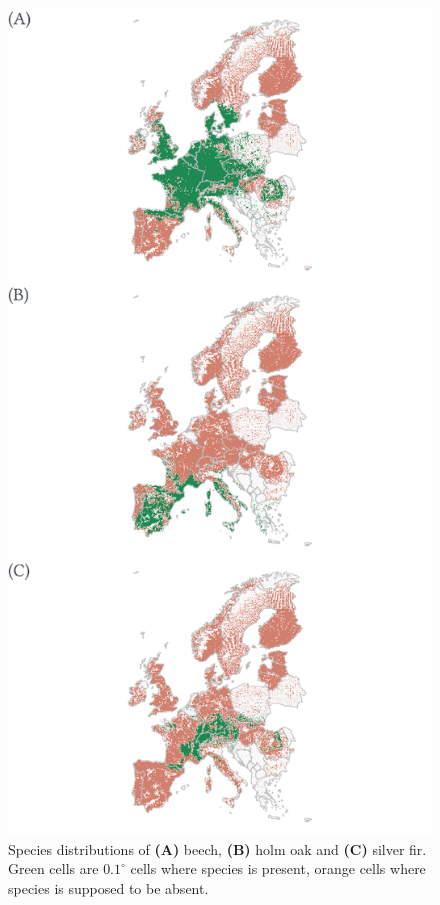 \documentclass[11pt,]{article}
\begin{document}
\begin{figure}
\centering
\includegraphics{figs/distributionmaps.pdf}
\caption{Species distributions of \textbf{(A)} beech, \textbf{(B)} holm
oak and \textbf{(C)} silver fir. Green cells are \(0.1^\circ\) cells
where species is present, orange cells where species is supposed to be
absent.}
\end{figure}
\end{document}
